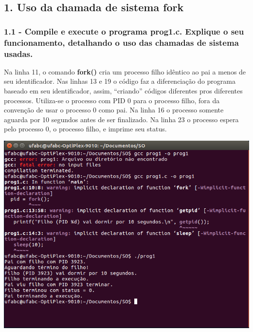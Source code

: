 \subsection*{1. Uso da chamada de sistema fork}

\subsubsection{1.1 - Compile e execute o programa prog1.c. Explique o seu funcionamento, detalhando o uso das chamadas de sistema usadas.}

\vspace{-0.5em}
\begin{minipage}{\textwidth}
  \hspace{-1em}
  \centering
  
  \label{prog1}
  \hspace{1em}
\end{minipage}
\vspace{0.5em}

Na linha 11, o comando \textbf{fork()} cria um processo filho idêntico ao pai a menos de seu identificador. Nas linhas 13 e 19 o código faz a diferenciação do programa baseado em seu identificador, assim, ``criando'' códigos diferentes pros diferentes processos. Utiliza-se o processo com PID 0 para o processo filho, fora da convenção de usar o processo 0 como pai. Na linha 16 o processo somente aguarda por 10 segundos antes de ser finalizado. Na linha 23 o processo espera pelo processo 0, o processo filho, e imprime seu status.

\vspace{2em}
\begin{minipage}{\textwidth}
    \hspace{-1em}
    \centering
    \includegraphics[scale=.4]{pratica1/prog1.png}
    \label{prog1png}
    \hspace{1em}
\end{minipage}
\vspace{0.5em}

